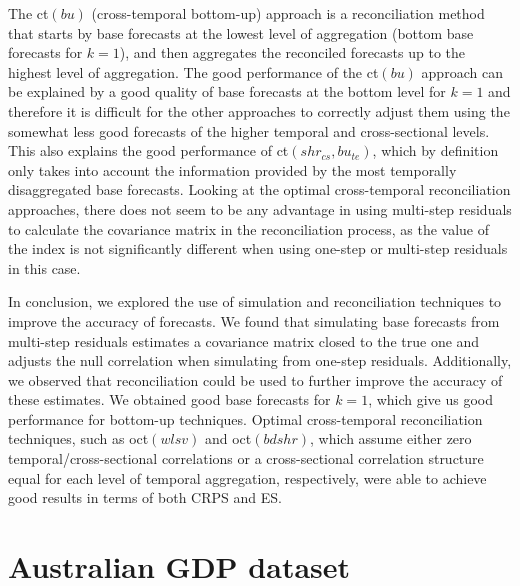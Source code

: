 \documentclass[a4paper,11pt]{article}
\theoremstyle{definition}
\begin{document}
The ct$(bu)$ (cross-temporal bottom-up) approach is a reconciliation method that starts by base forecasts at the lowest level of aggregation (bottom base forecasts for $k = 1$), and then aggregates the reconciled forecasts up to the highest level of aggregation. The good performance of the ct$(bu)$ approach can be explained by a good quality of base forecasts at the bottom level for $k=1$ and therefore it is difficult for the other approaches to correctly adjust them using the somewhat less good forecasts of the higher temporal and cross-sectional levels. This also explains the good performance of ct$(shr_{cs}, bu_{te})$, which by definition only takes into account the information provided by the most temporally disaggregated base forecasts.
Looking at the optimal cross-temporal reconciliation approaches, there does not seem to be any advantage in using multi-step residuals to calculate the covariance matrix in the reconciliation process, as the value of the index is not significantly different when using one-step or multi-step residuals in this case.

In conclusion, we explored the use of simulation and reconciliation techniques to improve the accuracy of forecasts. We found that simulating base forecasts from multi-step residuals estimates a covariance matrix closed to the true one and adjusts the null correlation when simulating from one-step residuals. Additionally, we observed that reconciliation could be used to further improve the accuracy of these estimates. We obtained good base forecasts for $k=1$, which give us good performance for bottom-up techniques. Optimal cross-temporal reconciliation techniques, such as oct$(wlsv)$ and oct$(bdshr)$, which assume either zero temporal/cross-sectional correlations or a cross-sectional correlation structure equal for each level of temporal aggregation, respectively, were able to achieve good results in terms of both CRPS and ES.

\section{Australian GDP dataset}\label{sec:ausgdp}
\end{document}
